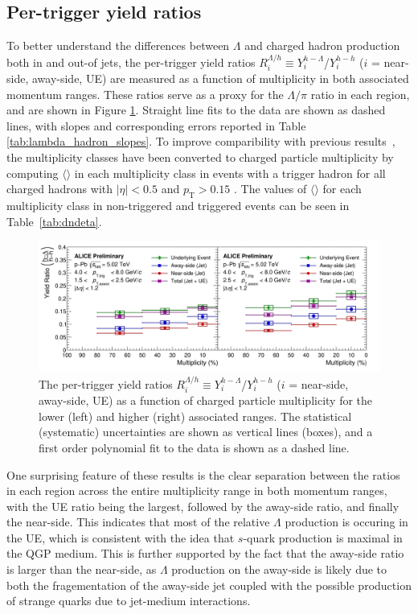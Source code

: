 \subsection{Per-trigger yield ratios}

To better understand the differences between $\Lambda$ and charged hadron production both in and out-of jets, the per-trigger yield ratios $R_{i}^{\Lambda/h} \equiv Y_{i}^{h-\Lambda}$/$Y_{i}^{h-h}$ ($i$ = near-side, away-side, UE) are measured as a function of multiplicity in both associated momentum ranges. These ratios serve as a proxy for the $\Lambda/\pi$ ratio in each region, and are shown in Figure \ref{fig:lambda_hadron_ratio}. Straight line fits to the data are shown as dashed lines, with slopes and corresponding errors reported in Table \ref{tab:lambda_hadron_slopes}. To improve comparibility with previous results~\cite{ALICEpPbEnhancement,ALICEppEnhancement}, the multiplicity classes have been converted to charged particle multiplicity by computing $\langle$\dndeta$\rangle$ in each multiplicity class in events with a trigger hadron for all charged hadrons with $|\eta| < 0.5$ and $p_{\text{T}} > 0.15$ \GeVc. The values of $\langle$\dndeta$\rangle$ for each multiplicity class in non-triggered and triggered events can be seen in Table~\ref{tab:dndeta}.

\begin{figure}[h!]
\centering
\includegraphics[width=\textwidth]{figures/results/ratio_plot.png}
\caption{The per-trigger yield ratios $R_{i}^{\Lambda/h} \equiv Y_{i}^{h-\Lambda}$/$Y_{i}^{h-h}$ ($i$ = near-side, away-side, UE) as a function of charged particle multiplicity for the lower (left) and higher (right) associated \pt ranges. The statistical (systematic) uncertainties are shown as vertical lines (boxes), and a first order polynomial fit to the data is shown as a dashed line.}
\label{fig:lambda_hadron_ratio}
\end{figure}

One surprising feature of these results is the clear separation between the ratios in each region across the entire multiplicity range in both momentum ranges, with the UE ratio being the largest, followed by the away-side ratio, and finally the near-side. This indicates that most of the relative $\Lambda$ production is occuring in the UE, which is consistent with the idea that $s$-quark production is maximal in the QGP medium. This is further supported by the fact that the away-side ratio is larger than the near-side, as $\Lambda$ production on the away-side is likely due to both the fragementation of the away-side jet coupled with the possible production of strange quarks due to jet-medium interactions. 

